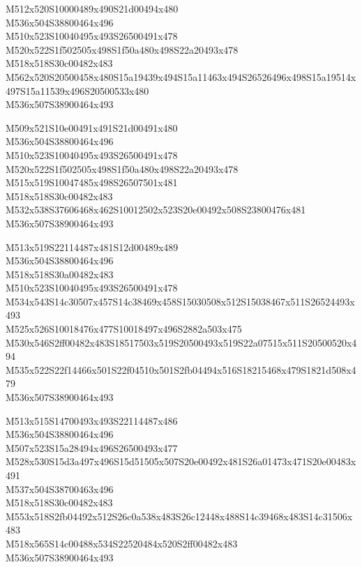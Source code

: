 \documentclass{article}
\begin{document}
\begin{multicols}{5}
\begin{center}

M512x520S10000489x490S21d00494x480 %
\\M536x504S38800464x496 %
\\M510x523S10040495x493S26500491x478 %
\\M520x522S1f502505x498S1f50a480x498S22a20493x478 %
\\M518x518S30c00482x483 %
\\M562x520S20500458x480S15a19439x494S15a11463x494S26526496x498S15a19514x497S15a11539x496S20500533x480 %
\\M536x507S38900464x493 %
\vfil
\columnbreak

M509x521S10e00491x491S21d00491x480 %
\\M536x504S38800464x496 %
\\M510x523S10040495x493S26500491x478 %
\\M520x522S1f502505x498S1f50a480x498S22a20493x478 %
\\M515x519S10047485x498S26507501x481 %
\\M518x518S30c00482x483 %
\\M532x538S37606468x462S10012502x523S20e00492x508S23800476x481 %
\\M536x507S38900464x493 %
\vfil
\columnbreak

M513x519S22114487x481S12d00489x489 %
\\M536x504S38800464x496 %
\\M518x518S30a00482x483 %
\\M510x523S10040495x493S26500491x478 %
\\M534x543S14c30507x457S14c38469x458S15030508x512S15038467x511S26524493x493 %
\\M525x526S10018476x477S10018497x496S2882a503x475 %
\\M530x546S2ff00482x483S18517503x519S20500493x519S22a07515x511S20500520x494 %
\\M535x522S22f14466x501S22f04510x501S2fb04494x516S18215468x479S1821d508x479 %
\\M536x507S38900464x493 %
\vfil
\columnbreak

M513x515S14700493x493S22114487x486 %
\\M536x504S38800464x496 %
\\M507x523S15a28494x496S26500493x477 %
\\M528x530S15d3a497x496S15d51505x507S20e00492x481S26a01473x471S20e00483x491 %
\\M537x504S38700463x496 %
\\M518x518S30c00482x483 %
\\M553x518S2fb04492x512S26c0a538x483S26c12448x488S14c39468x483S14c31506x483 %
\\M518x565S14c00488x534S22520484x520S2ff00482x483 %
\\M536x507S38900464x493 %
\vfil
\columnbreak


\end{center}
\end{multicols}
\end{document}
